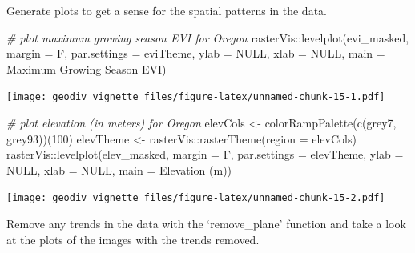 \documentclass[
]{article}
\newenvironment{Shaded}{\begin{snugshade}}{\end{snugshade}}
\newcommand{\AttributeTok}[1]{\textcolor[rgb]{0.77,0.63,0.00}{#1}}
\newcommand{\CommentTok}[1]{\textcolor[rgb]{0.56,0.35,0.01}{\textit{#1}}}
\newcommand{\ConstantTok}[1]{\textcolor[rgb]{0.00,0.00,0.00}{#1}}
\newcommand{\DecValTok}[1]{\textcolor[rgb]{0.00,0.00,0.81}{#1}}
\newcommand{\FunctionTok}[1]{\textcolor[rgb]{0.00,0.00,0.00}{#1}}
\newcommand{\NormalTok}[1]{#1}
\newcommand{\OtherTok}[1]{\textcolor[rgb]{0.56,0.35,0.01}{#1}}
\newcommand{\SpecialCharTok}[1]{\textcolor[rgb]{0.00,0.00,0.00}{#1}}
\newcommand{\StringTok}[1]{\textcolor[rgb]{0.31,0.60,0.02}{#1}}
\begin{document}
Generate plots to get a sense for the spatial patterns in the data.

\begin{Shaded}
\begin{Highlighting}[]
\CommentTok{\# plot maximum growing season EVI for Oregon}
\NormalTok{rasterVis}\SpecialCharTok{::}\FunctionTok{levelplot}\NormalTok{(evi\_masked, }\AttributeTok{margin =}\NormalTok{ F, }\AttributeTok{par.settings =}\NormalTok{ eviTheme, }
                     \AttributeTok{ylab =} \ConstantTok{NULL}\NormalTok{, }\AttributeTok{xlab =} \ConstantTok{NULL}\NormalTok{, }
                     \AttributeTok{main =} \StringTok{\textquotesingle{}Maximum Growing Season EVI\textquotesingle{}}\NormalTok{)}
\end{Highlighting}
\end{Shaded}

\texttt{[image: geodiv\_vignette\_files/figure-latex/unnamed-chunk-15-1.pdf]}

\begin{Shaded}
\begin{Highlighting}[]

\CommentTok{\# plot elevation (in meters) for Oregon}
\NormalTok{elevCols }\OtherTok{\textless{}{-}} \FunctionTok{colorRampPalette}\NormalTok{(}\FunctionTok{c}\NormalTok{(}\StringTok{\textquotesingle{}grey7\textquotesingle{}}\NormalTok{, }\StringTok{\textquotesingle{}grey93\textquotesingle{}}\NormalTok{))(}\DecValTok{100}\NormalTok{)}
\NormalTok{elevTheme }\OtherTok{\textless{}{-}}\NormalTok{ rasterVis}\SpecialCharTok{::}\FunctionTok{rasterTheme}\NormalTok{(}\AttributeTok{region =}\NormalTok{ elevCols)}
\NormalTok{rasterVis}\SpecialCharTok{::}\FunctionTok{levelplot}\NormalTok{(elev\_masked, }\AttributeTok{margin =}\NormalTok{ F, }\AttributeTok{par.settings =}\NormalTok{ elevTheme, }
                     \AttributeTok{ylab =} \ConstantTok{NULL}\NormalTok{, }\AttributeTok{xlab =} \ConstantTok{NULL}\NormalTok{, }\AttributeTok{main =} \StringTok{\textquotesingle{}Elevation (m)\textquotesingle{}}\NormalTok{)}
\end{Highlighting}
\end{Shaded}

\texttt{[image: geodiv\_vignette\_files/figure-latex/unnamed-chunk-15-2.pdf]}

Remove any trends in the data with the `remove\_plane' function and take
a look at the plots of the images with the trends removed.
\end{document}
